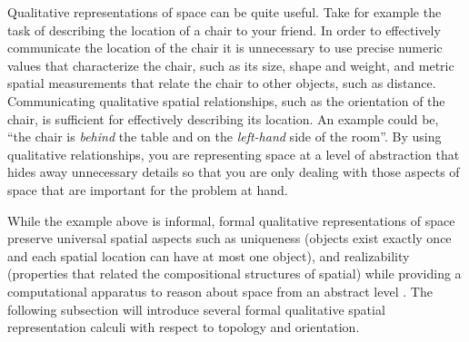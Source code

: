 \documentclass[12pt]{ucthesis}
\begin{document}
Qualitative representations of space can be quite useful. Take for example the task of describing the location of a chair to your friend. 
In order to effectively communicate the location of the chair it is unnecessary to use precise numeric values that characterize the chair, such as its size, shape and weight, and metric spatial measurements that relate the chair to other objects, such as distance. Communicating qualitative spatial relationships, such as the orientation of the chair, is sufficient for effectively describing its location. An example could be, ``the chair is \emph{behind} the table and on the \emph{left-hand} side of the room''. By using qualitative relationships, you are representing space at a level of abstraction that hides away unnecessary details so that you are only dealing with those aspects of space that are important for the problem at hand.

While the example above is informal, formal qualitative representations of space preserve universal spatial aspects such as uniqueness (objects exist exactly once and each spatial location can have at most one object), and realizability (properties that related the compositional structures of spatial) while providing a computational apparatus to reason about space from an abstract level \cite{freksa1991qsr}. The following subsection will introduce several formal qualitative spatial representation calculi with respect to topology and orientation. 



\end{document}
